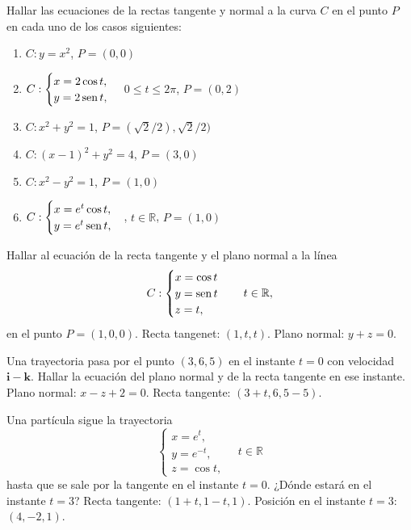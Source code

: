 {Hallar las ecuaciones de la rectas tangente y normal a la curva $C$ en el punto $P$ en cada uno de los casos siguientes:
\begin{enumerate}
\item $C: y=x^2$, $P=(0,0)$
\item $C: \begin{cases}
x=2\cos t,\\
y=2\operatorname{sen} t,
\end{cases}
$ $0\leq t\leq 2\pi$, $P=(0,2)$
\item $C:x^2+y^2=1$, $P=(\sqrt{2}/2),\sqrt{2}/2)$
\item $C:(x-1)^2+y^2=4$, $P=(3,0)$
\item $C:x^2-y^2=1$, $P=(1,0)$
\item $C:\begin{cases}
x=e^t\cos t,\\
y=e^t\operatorname{sen} t,
\end{cases}
$, $t\in \mathbb{R}$, $P=(1,0)$
\end{enumerate}
}
{
}
{
}


{Hallar al ecuación de la recta tangente y el plano normal a la línea
\[
C: 
\begin{cases}
x=\cos t \\
y=\operatorname{sen} t\\
z= t,
\end{cases}
\quad t\in \mathbb{R},
\]
en el punto $P=(1,0,0)$.
}
{Recta tangenet: $(1,t,t)$. Plano normal: $y+z=0$.
}
{
}


{Una trayectoria pasa por el punto $(3,6,5)$ en el instante $t=0$ con velocidad $\mathbf{i}-\mathbf{k}$. 
Hallar la ecuación del plano normal y de la recta tangente en ese instante.
}
{Plano normal: $x-z+2=0$. Recta tangente: $(3+t,6,5-5)$.
}
{
}


{Una partícula sigue la trayectoria
\[
\begin{cases}
x=e^t,\\
y=e^{-t},\\
z=\cos t,
\end{cases}
\quad t\in \mathbb{R}
\]
hasta que se sale por la tangente en el instante $t=0$. ¿Dónde estará en el instante $t=3$?
}
{Recta tangente: $(1+t,1-t,1)$. Posición en el instante $t=3$: $(4,-2,1)$.
}
{
}